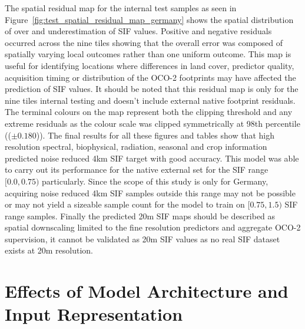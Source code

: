 The spatial residual map for the internal test samples as seen in Figure~\ref{fig:test_spatial_residual_map_germany} shows the spatial distribution of over and underestimation of SIF values. Positive and negative residuals occurred across the nine tiles showing that the overall error was composed of spatially varying local outcomes rather than one uniform outcome. This map is useful for identifying locations where differences in land cover, predictor quality, acquisition timing or distribution of the OCO-2 footprints may have affected the prediction of SIF values. It should be noted that this residual map is only for the nine tiles internal testing and doesn't include external native footprint residuals. The terminal colours on the map represent both the clipping threshold and any extreme residuals as the colour scale was clipped symmetrically at 98th percentile (($\pm 0.180$)). The final results for all these figures and tables show that high resolution spectral, biophysical, radiation, seasonal and crop information predicted noise reduced 4km SIF target with good accuracy. This model was able to carry out its performance for the native external set for the SIF range $[0.0,0.75)$ particularly. Since the scope of this study is only for Germany, acquiring noise reduced 4km SIF samples outside this range may not be possible or may not yield a sizeable sample count for the model to train on $[0.75,1.5)$ SIF range samples. Finally the predicted 20m SIF maps should be described as spatial downscaling limited to the fine resolution predictors and aggregate OCO-2 supervision, it cannot be validated as 20m SIF values as no real SIF dataset exists at 20m resolution.

\section{Effects of Model Architecture and Input Representation}

